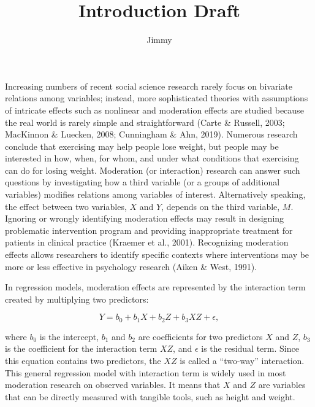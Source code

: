 \documentclass[
  man]{apa7}
\title{Introduction Draft}
\author{Jimmy\textsuperscript{}}
\date{}
\affiliation{\phantom{0}}
\begin{document}
\maketitle

Increasing numbers of recent social science research rarely focus on bivariate relations among variables; instead, more sophisticated theories with assumptions of intricate effects such as nonlinear and moderation effects are studied because the real world is rarely simple and straightforward (Carte \& Russell, 2003; MacKinnon \& Luecken, 2008; Cunningham \& Ahn, 2019). Numerous research conclude that exercising may help people lose weight, but people may be interested in how, when, for whom, and under what conditions that exercising can do for losing weight. Moderation (or interaction) research can answer such questions by investigating how a third variable (or a groups of additional variables) modifies relations among variables of interest. Alternatively speaking, the effect between two variables, \(X\) and \(Y\), depends on the third variable, \(M\). Ignoring or wrongly identifying moderation effects may result in designing problematic intervention program and providing inappropriate treatment for patients in clinical practice (Kraemer et al., 2001). Recognizing moderation effects allows researchers to identify specific contexts where interventions may be more or less effective in psychology research (Aiken \& West, 1991).

In regression models, moderation effects are represented by the interaction term created by multiplying two predictors:

\begin{equation}
Y = b_{0} + b_{1}X + b_{2}Z + b_{3}XZ + \epsilon,
\end{equation}

where \(b_{0}\) is the intercept, \(b_{1}\) and \(b_{2}\) are coefficients for two predictors \(X\) and \(Z\), \(b_{3}\) is the coefficient for the interaction term \(XZ\), and \(\epsilon\) is the residual term. Since this equation contains two predictors, the \(XZ\) is called a ``two-way'' interaction. This general regression model with interaction term is widely used in most moderation research on observed variables. It means that \(X\) and \(Z\) are variables that can be directly measured with tangible tools, such as height and weight.
\end{document}
